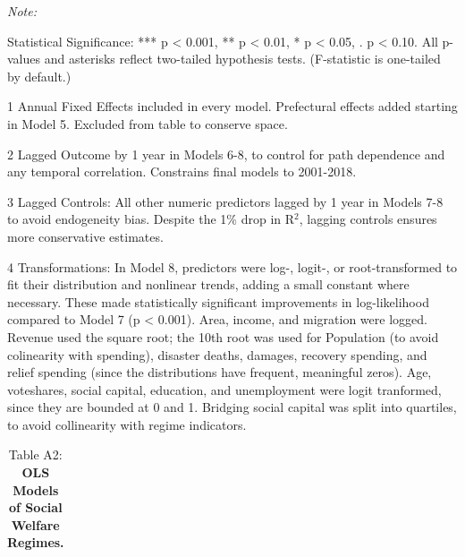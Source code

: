 \documentclass[preprint, 3p,
authoryear]{elsarticle} %
\begin{document}
\begin{landscape}
\renewcommand{\baselinestretch}{0.5}\selectfont
\renewcommand{\arraystretch}{1.5}

\begingroup\fontsize{10}{12}\selectfont

\begin{ThreePartTable}
\begin{TableNotes}
\item \textit{Note: } 
\item Statistical Significance: *** p < 0.001, ** p < 0.01, * p < 0.05, . p < 0.10. All p-values and asterisks reflect two-tailed hypothesis tests. (F-statistic is one-tailed by default.)
\item[1] Annual Fixed Effects included in every model. Prefectural effects added starting in Model 5. Excluded from table to conserve space.
\item[2] Lagged Outcome by 1 year in Models 6-8, to control for path dependence and any temporal correlation. Constrains final models to 2001-2018.
\item[3] Lagged Controls: All other numeric predictors lagged by 1 year in Models 7-8 to avoid endogeneity bias. Despite the 1\% drop in R$^{2}$, lagging controls ensures more conservative estimates.
\item[4] Transformations: In Model 8, predictors were log-, logit-, or root-transformed to fit their distribution and nonlinear trends, adding a small constant where necessary. These made statistically significant improvements in log-likelihood compared to Model 7 (p < 0.001). Area, income, and migration were logged. Revenue used the square root; the 10th root was used for Population (to avoid colinearity with spending), disaster deaths, damages, recovery spending, and relief spending (since the distributions have frequent, meaningful zeros). Age, voteshares, social capital, education, and unemployment were logit tranformed, since they are bounded at 0 and 1. Bridging social capital was split into quartiles, to avoid collinearity with regime indicators.
\end{TableNotes}
\begin{longtabu} to 
\caption{\label{tab:unnamed-chunk-11}Table A2: \textbf{OLS Models of Social Welfare Regimes.}
}
\end{longtabu}
\end{ThreePartTable}
\end{landscape}
\end{document}
